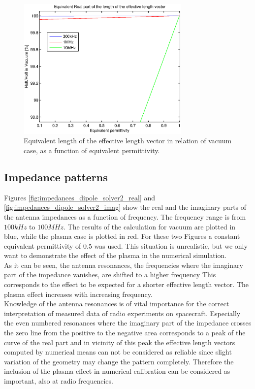 \documentclass[two-coloumn,ras]{agutex}
\begin{document}
\begin{article}
\begin{figure}
  \noindent\includegraphics[width=20pc]{heff_shortening_dipole.eps}
\caption{Equivalent length of the effective length vector in relation of vacuum case, as a function of equivalent permittivity.}
\label{fig:relative_heff_shortening}
\end{figure}

\subsection{Impedance patterns}
Figures \ref{fig:impedances_dipole_solver2_real} and \ref{fig:impedances_dipole_solver2_imag} show the real and the imaginary parts of the antenna impedances as a function of frequency. The frequency range is from $100kHz$ to $100MHz$. The results of the calculation for vacuum are plotted in blue, while the plasma case is plotted in red. For these two Figures a constant equivalent permittivity of 0.5 was used. This situation is unrealistic, but we only want to demonstrate the effect of the plasma in the numerical simulation.\\

As it can be seen, the antenna resonances, the frequencies where the imaginary part of the impedance vanishes, are shifted to a higher frequency This corresponds to the effect to be expected for a shorter effective length vector. The plasma effect increases with increasing frequency.\\

Knowledge of the antenna resonances is of vital importance for the correct interpretation of measured data of radio experiments on spacecraft. Especially the even numbered resonances where the imaginary part of the impedance crosses the zero line from the positive to the negative area corresponds to a peak of the curve of the real part and in vicinity of this peak the effective length vectors computed by numerical means can not be considered as reliable since slight variation of the geometry may change the pattern completely. Therefore the inclusion of the plasma effect in numerical calibration can be considered as important, also at radio frequencies.\\



\end{article}
\end{document}
